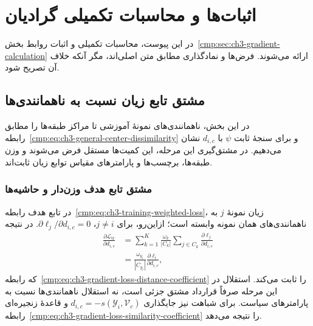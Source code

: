 \chapter{اثبات‌ها و محاسبات تکمیلی گرادیان}
\label{app:ch3-gradient-derivations}

در این پیوست، محاسبات تکمیلی و اثبات روابط
بخش~\ref{cmp:sec:ch3-gradient-calculation} ارائه
می‌شوند. فرض‌ها و نمادگذاری مطابق متن اصلی‌اند،
مگر آنکه خلاف آن تصریح شود.

\section{مشتق تابع زیان نسبت به ناهمانندی‌ها}
\label{app:ch3-gradient-loss-dissimilarities}

در این بخش، ناهمانندی‌های نمونهٔ آموزشی تا مراکز
طبقه‌ها را مطابق
رابطه~\eqref{cmp:eq:ch3-general-center-dissimilarity}
و برای سنجهٔ ثابت $\psi$ با $d_{i,c}$ نشان می‌دهیم.
در مشتق‌گیری این مرحله، این کمیت‌ها مستقل فرض
می‌شوند و وزن طبقه‌ها، برچسب‌ها و پارامترهای مقیاس
توابع زیان ثابت‌اند.

\subsection{مشتق تابع هدف وزن‌دار و حاشیه‌ها}
\label{app:ch3-gradient-loss-margin-chain}

در تابع هدف
رابطه~\eqref{cmp:eq:ch3-training-weighted-loss}،
زیان نمونهٔ $j$ به ناهمانندی‌های همان نمونه وابسته
است؛ ازاین‌رو، برای $j\ne i$،
$\partial\ell_j/\partial d_{i,c}=0$.
در نتیجه
\[
\begin{aligned}
\frac{\partial\mathcal L_{\mathrm{tr}}}{\partial d_{i,c}}
&=\sum_{k=1}^{K}\frac{\omega_k}{|C_k|}
\sum_{j\in C_k}\frac{\partial\ell_j}{\partial d_{i,c}}\\
&=\frac{\omega_{y_i}}{|C_{y_i}|}
\frac{\partial\ell_i}{\partial d_{i,c}},
\end{aligned}
\]
که رابطه~\eqref{cmp:eq:ch3-gradient-loss-distance-coefficient}
را ثابت می‌کند. استقلال در این مرحله صرفاً
قرارداد مشتق جزئی است، نه استقلال ناهمانندی‌ها
نسبت به پارامترهای سیاست. برای شباهت نیز
جایگذاری $d_{i,c}=-s(\mathscr Y_i,\mathcal V_c)$
و قاعدهٔ زنجیره‌ای
رابطه~\eqref{cmp:eq:ch3-gradient-loss-similarity-coefficient}
را نتیجه می‌دهد.

